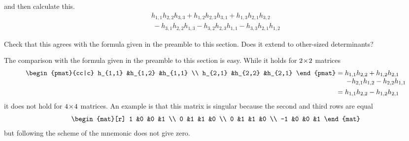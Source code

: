 \begin{exercises}
\begin{equation*}
     \end{equation*}
     and then calculate this.
     \begin{equation*}
      \begin{array}{l}
      h_{1,1}h_{2,2}h_{3,3}+h_{1,2}h_{2,3}h_{3,1}+h_{1,3}h_{2,1}h_{3,2} \\
      \>-h_{3,1}h_{2,2}h_{1,3}-h_{3,2}h_{2,3}h_{1,1}
        -h_{3,3}h_{2,1}h_{1,2}
      \end{array}
    \end{equation*}
    \begin{exparts}
      \partsitem Check that this agrees with the formula given in the 
        preamble to this section.
      \partsitem Does it extend to other-sized determinants?
    \end{exparts}
    \begin{answer}
      \begin{exparts}
        \partsitem The comparison with the formula given in the preamble to
          this section is easy.
        \partsitem While it holds for \( 2 \! \times \! 2 \) matrices
          \begin{align*}
            \begin{pmat}{cc|c}
              h_{1,1} &h_{1,2} &h_{1,1} \\
              h_{2,1} &h_{2,2} &h_{2,1}
            \end{pmat}
            &=\begin{array}[t]{@{}l@{}}
              h_{1,1}h_{2,2}+h_{1,2}h_{2,1}  \\
              \>-h_{2,1}h_{1,2}-h_{2,2}h_{1,1}
            \end{array}                                     \\
            &=h_{1,1}h_{2,2}-h_{1,2}h_{2,1}
          \end{align*}
          it does not hold for \( 4 \! \times \! 4 \) matrices.
          An example is that this matrix is
          singular because the second and third rows are equal 
          \begin{equation*}
            \begin{mat}[r]  
              1  &0  &0  &1   \\
              0  &1  &1  &0   \\
              0  &1  &1  &0   \\
             -1  &0  &0  &1  
            \end{mat}
          \end{equation*}
          but following the scheme of the mnemonic does not give zero.

\end{exparts}
\end{answer}
\end{exercises}
